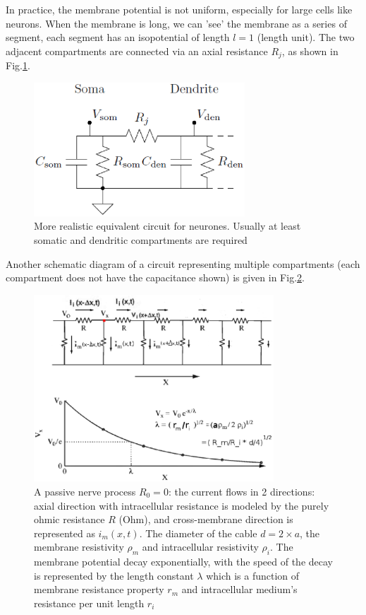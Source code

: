 In practice, the membrane potential is not uniform, especially for large cells
like neurons. When the membrane is long, we can 'see' the membrane as a series
of segment, each segment has an isopotential of length $l=1$ (length unit). 
The two adjacent compartments are connected via an axial resistance $R_j$, as
shown in Fig.\ref{fig:membrane_RC-multiple-cpt}.

\begin{figure}[hbt]
  \centerline{\includegraphics[height=5cm,
    angle=0]{./images/membrane_RC-multiple-cpt.eps}}
  \caption{More realistic equivalent circuit for neurones. Usually at
least somatic and dendritic compartments are required}
  \label{fig:membrane_RC-multiple-cpt}
\end{figure}


Another schematic diagram of a circuit representing multiple compartments
(each compartment does not have the capacitance shown) is given in
Fig.\ref{fig:circuit1}.

\begin{figure}[htb]
\centerline{\includegraphics[height=7cm]{./images/membrane_simplemodel.eps}}
\caption{A passive nerve process $R_0 = 0$: the current flows in 2 directions:
axial direction with intracellular resistance is modeled by the purely ohmic
resistance $R$ (Ohm), and cross-membrane direction is represented as $i_m(x,t)$.
The diameter of the cable $d=2\times a$, the membrane resistivity $\rho_m$ and
intracellular resistivity $\rho_i$. The membrane potential decay exponentially,
with the speed of the decay is represented by the length constant $\lambda$ which is a function of membrane
resistance property $r_m$ and intracellular medium's resistance per unit length
$r_i$}\label{fig:circuit1}
\end{figure} 

